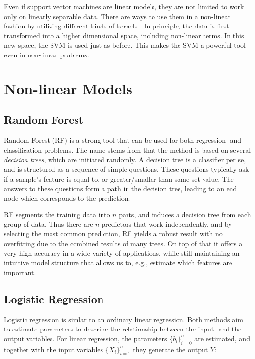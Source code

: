 Even if support vector machines are linear models, they are not limited to work only on linearly separable data. There are ways to use them in a non-linear fashion by utilizing different kinds of kernels \citep{xia_2016}. In principle, the data is first transformed into a higher dimensional space, including non-linear terms. In this new space, the SVM is used just as before. This makes the SVM a powerful tool even in non-linear problems.

\section{Non-linear Models}

\subsection*{Random Forest}
Random Forest (RF) is a strong tool that can be used for both regression- and classification problems. The name stems from that the method is based on several \textit{decision trees}, which are initiated randomly. A decision tree is a classifier per se, and is structured as a sequence of simple questions. These questions typically ask if a sample's feature is equal to, or greater/smaller than some set value. The answers to these questions form a path in the decision tree, leading to an end node which corresponds to the prediction.

RF segments the training data into $n$ parts, and induces a decision tree from each group of data. Thus there are $n$ predictors that work independently, and by selecting the most common prediction, RF yields a robust result with no overfitting due to the combined results of many trees. On top of that it offers a very high accuracy in a wide variety of applications, while still maintaining an intuitive model structure that allows us to, e.g., estimate which features are important. \citep{breiman_cutler_2018}


\subsection*{Logistic Regression}
Logistic regression is simlar to an ordinary linear regression. Both methods aim to estimate parameters to describe the relationship between the input- and the output variables. For linear regression, the parameters $\{b_i\}_{i=0}^n$ are estimated, and together with the input variables $\{X_i\}_{i=1}^n$ they generate the output $Y$:


